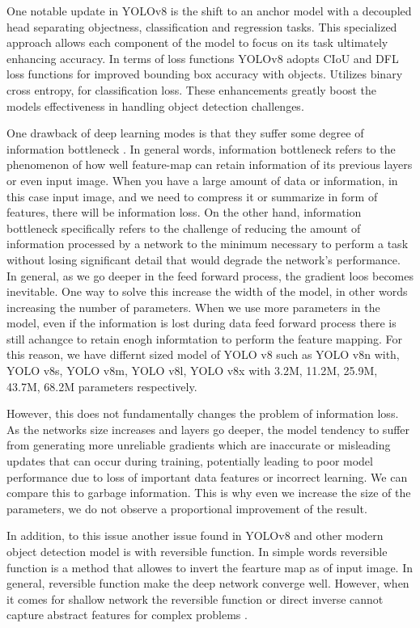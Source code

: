 One notable update in YOLOv8 is the shift to an anchor model with a decoupled head separating objectness, classification and regression tasks. This specialized approach allows each component of the model to focus on its task ultimately enhancing accuracy. In terms of loss functions YOLOv8 adopts CIoU and DFL loss functions for improved bounding box accuracy with objects. Utilizes binary cross entropy, for classification loss. These enhancements greatly boost the models effectiveness in handling object detection challenges.


One  drawback of deep learning modes is that they suffer some degree of information bottleneck \cite{tishby2015deep}. In general words, information bottleneck refers to the phenomenon of how well feature-map can retain information of its previous layers or even input image. When you have a large amount of data or information, in this case input image, and we need to compress it or summarize in form of features, there will be information loss. On the other hand, information bottleneck specifically refers to the challenge of reducing the amount of information processed by a network to the minimum necessary to perform a task without losing significant detail that would degrade the network's performance.  In general, as we go deeper in the feed forward process, the gradient loos becomes inevitable. One way to solve this increase the width of the model, in other words increasing the number of parameters.  When we use more parameters in the model, even if the information is lost during data feed forward process there is still achangce to retain enogh informtation to perform the feature mapping. For this reason, we have differnt sized model of YOLO v8 such as YOLO v8n with, YOLO v8s, YOLO v8m, YOLO v8l, YOLO v8x with 3.2M, 11.2M, 25.9M, 43.7M, 68.2M parameters respectively. 

However, this does not fundamentally changes the problem of information loss. As the networks size increases and layers go deeper, the model tendency to suffer from generating more unreliable gradients which are inaccurate or misleading updates that can occur during training, potentially leading to poor model performance due to loss of important data features or incorrect learning. We can compare this to garbage information. This is why even we increase the size of the parameters, we do not observe a proportional improvement of the result.

In addition, to this issue another issue found in YOLOv8 and other modern object detection model is with reversible function. In simple words reversible function is a method that allowes to invert the fearture map as of  input image. In general, reversible function make the deep network converge well. However, when it comes for shallow network the reversible function or direct inverse cannot capture abstract features for complex problems \cite{wang2024yolov9}.



